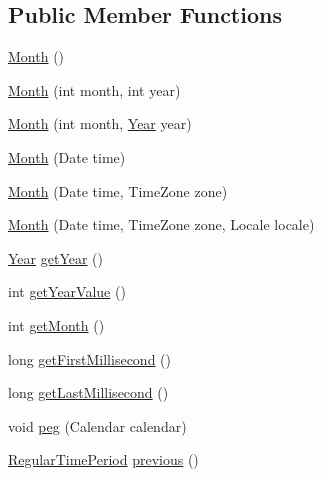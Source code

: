 \subsection*{Public Member Functions}
\begin{DoxyCompactItemize}
\item 
\mbox{\hyperlink{classorg_1_1jfree_1_1data_1_1time_1_1_month_a4911b90fade2eb1a8a0de2efc621b1bd}{Month}} ()
\item 
\mbox{\hyperlink{classorg_1_1jfree_1_1data_1_1time_1_1_month_a36edc703a61f79b8364bfbc63297ca6d}{Month}} (int month, int year)
\item 
\mbox{\hyperlink{classorg_1_1jfree_1_1data_1_1time_1_1_month_aa1b4847527f39ae747bee56f097b76bc}{Month}} (int month, \mbox{\hyperlink{classorg_1_1jfree_1_1data_1_1time_1_1_year}{Year}} year)
\item 
\mbox{\hyperlink{classorg_1_1jfree_1_1data_1_1time_1_1_month_ac17a55a0ba55529c1490bc88637a39ef}{Month}} (Date time)
\item 
\mbox{\hyperlink{classorg_1_1jfree_1_1data_1_1time_1_1_month_a77f47ebcba75484c9b3054b4eb201ccc}{Month}} (Date time, Time\+Zone zone)
\item 
\mbox{\hyperlink{classorg_1_1jfree_1_1data_1_1time_1_1_month_a4123b55e72a84ec809ce1da11abe2d78}{Month}} (Date time, Time\+Zone zone, Locale locale)
\item 
\mbox{\hyperlink{classorg_1_1jfree_1_1data_1_1time_1_1_year}{Year}} \mbox{\hyperlink{classorg_1_1jfree_1_1data_1_1time_1_1_month_a754f301f5b5cbf462655eddf616761f6}{get\+Year}} ()
\item 
int \mbox{\hyperlink{classorg_1_1jfree_1_1data_1_1time_1_1_month_a75ebe3893bbd8c5edbbf812fe21c4b75}{get\+Year\+Value}} ()
\item 
int \mbox{\hyperlink{classorg_1_1jfree_1_1data_1_1time_1_1_month_ad9cb88584820021114002c786b8a1628}{get\+Month}} ()
\item 
long \mbox{\hyperlink{classorg_1_1jfree_1_1data_1_1time_1_1_month_a87e8e3a27514d0290c33041eed3b1a83}{get\+First\+Millisecond}} ()
\item 
long \mbox{\hyperlink{classorg_1_1jfree_1_1data_1_1time_1_1_month_a34520ffd8f368cd11afc837840e77513}{get\+Last\+Millisecond}} ()
\item 
void \mbox{\hyperlink{classorg_1_1jfree_1_1data_1_1time_1_1_month_aabe5e5b144b7404d24109c8bee8c5519}{peg}} (Calendar calendar)
\item 
\mbox{\hyperlink{classorg_1_1jfree_1_1data_1_1time_1_1_regular_time_period}{Regular\+Time\+Period}} \mbox{\hyperlink{classorg_1_1jfree_1_1data_1_1time_1_1_month_ad7a8fcb640fd75a00c9bb827c1c06943}{previous}} ()

\end{DoxyCompactItemize}
